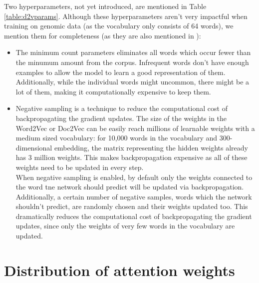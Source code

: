 Two hyperparameters, not yet introduced, are mentioned in Table \ref{table:d2vparams}. Although these hyperparameters aren't very impactful when training on genomic data (as the vocabulary only consists of 64 words), we mention them for completeness (as they are also mentioned in \cite{d2vsplicing}):
\begin{itemize}
	\item The minimum count parameters eliminates all words which occur fewer than the minumum amount from the corpus. Infrequent words don't have enough examples to allow the model to learn a good representation of them. Additionally, while the individual words might uncommon, there might be a lot of them, making it computationally expensive to keep them.
	
	\item Negative sampling \cite{w2v2} 
	is a technique to reduce the computational cost of backpropagating the gradient updates. The size of the weights in the Word2Vec or Doc2Vec can be easily reach millions of learnable weights with a medium sized vocabulary: for 10,000 words in the vocabulary and 300-dimensional embedding, the matrix representing the hidden weights already has 3 million weights. This makes backpropagation expensive as all of these weights need to be updated in every step. \\
	When negative sampling is enabled, by default only the weights connected to the word tne network should predict will be updated via backpropagation. Additionally, a certain number of negative samples, words which the network shouldn't predict, are randomly chosen and their weights updated too. This dramatically reduces the computational cost of backpropagating the gradient updates, since only the weights of very few words in the vocabulary are updated. 
\end{itemize}


\section{Distribution of attention weights}

